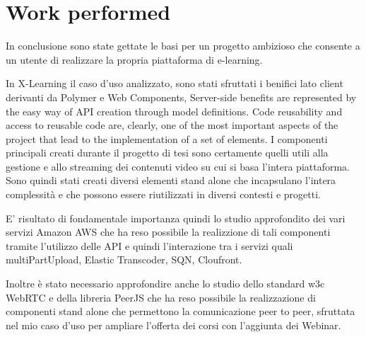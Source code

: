 \section{Work performed}
\label{sec:work_performed}
 
In conclusione sono state gettate le basi per un progetto ambizioso che consente a un utente di realizzare la propria piattaforma di e-learning.

In X-Learning il caso d'uso analizzato, sono stati sfruttati i benifici lato client derivanti da Polymer e Web Components, Server-side benefits are represented by the easy way of API creation through model definitions.
Code reusability and access to reusable code are, clearly, one of the most important aspects of the project that lead to the implementation of a set of elements.
I componenti principali creati durante il progetto di tesi sono certamente quelli utili alla gestione e allo streaming dei contenuti video su cui si basa l'intera piattaforma.
Sono quindi stati creati diversi elementi stand alone che incapsulano l'intera complessità e che possono essere riutilizzati in diversi contesti e progetti.

E' risultato di fondamentale importanza quindi lo studio approfondito dei vari servizi Amazon AWS che ha reso possibile la realizzione di tali componenti tramite l'utilizzo delle API e quindi l'interazione tra i servizi quali multiPartUpload, Elastic Transcoder, SQN, Cloufront.

Inoltre è stato necessario approfondire anche lo studio dello standard w3c WebRTC e della libreria PeerJS che ha reso possibile la realizzazione di componenti stand alone che permettono la comunicazione peer to peer, sfruttata nel mio caso d'uso per ampliare l'offerta dei corsi con l'aggiunta dei Webinar.